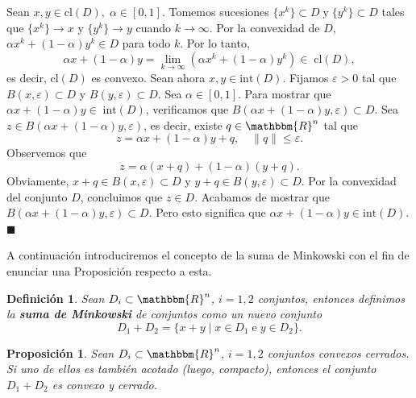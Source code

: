 \documentclass[a4paper,12pt]{report}
\newcommand{\RR}{\mathbbm{R}}
\newcommand{\Rn}{\RR^n}
\newcommand{\vep}{\varepsilon}
\newcommand{\arr}{\rightarrow}
\newtheorem{prop}[teo]{Proposici\'on}
\newtheorem{defi}[teo]{Definici\'on}
\newenvironment{dem}{\vspace*{-0.1cm}{\it Demostraci\'on:}}{\hfill
$\blacksquare$\\}
\begin{document}
\begin{dem}
Sean $x,y\in\mathrm{cl}(D), \;\alpha\in[0,1]$. Tomemos sucesiones \linebreak $\{x^k\}\subset D\;\mbox{y}\;\{y^k\}\subset D$ tales que $\{x^k\}\arr x$ y $\{y^k\}\arr y$ cuando $k\arr\infty$. Por la convexidad de $D$, $\alpha x^k+(1-\alpha)y^k\in D$ para todo $k$. Por lo tanto,
$$\alpha x+(1-\alpha)y=\lim_{k\arr\infty}(\alpha x^k+(1-\alpha)y^k)\in\;\mathrm{cl}(D),$$
es decir, $\mathrm{cl}(D)$ es convexo.
Sean ahora $x,y\in\mathrm{int}(D)$. Fijamos $\vep>0$ tal que \linebreak $B(x,\vep)\subset D$ y $B(y,\vep)\subset D$. Sea $\alpha\in[0,1]$. Para mostrar que $\alpha x+(1-\alpha)y\in\;\mathrm{int}(D)$, verificamos que $B(\alpha x+(1-\alpha)y,\vep)\subset D$.
Sea $z\in B(\alpha x+(1-\alpha)y,\vep)$, es decir, existe $q\in\Rn$ tal que
$$z=\alpha x+(1-\alpha)y+q,\quad\|q\|\leq\vep.$$
Observemos que
$$z=\alpha(x+q)+(1-\alpha)(y+q).$$
Obviamente, $x+q\in B(x,\vep)\subset D$ y $y+q\in B(y,\vep)\subset D$. Por la convexidad del conjunto $D$, concluimos que $z\in D$. Acabamos de mostrar que $B(\alpha x+(1-\alpha)y,\vep)\subset D$. Pero esto significa que $\alpha x+(1-\alpha)y\in\mathrm{int}(D)$.
\end{dem}

A continuaci\'on introduciremos el concepto de la suma de Minkowski con el fin de enunciar una Proposici\'on respecto a esta.

\begin{defi}
Sean $D_i\subset\Rn$, $i=1,2$ conjuntos, entonces definimos la \textbf{suma de Minkowski} de conjuntos como un nuevo conjunto $$D_1+D_2=\{x+y\mid x\in D_1\;\mathrm{e}\;y\in D_2\}.$$
\end{defi}

\begin{prop}
Sean $D_i\subset\Rn$, $i=1,2$ conjuntos convexos cerrados. Si uno de ellos es tambi\'en acotado (luego, compacto), entonces el conjunto $D_1 + D_2$ es convexo y cerrado.
\end{prop}

\end{document}
